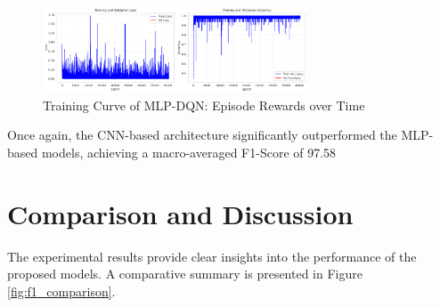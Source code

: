 \documentclass[16pt]{report}
\begin{document}
\begin{figure}[H]
    \centering
    \includegraphics[width=0.7\textwidth]{images/double_dqn_cnn_training_curves.png}
    \caption{Training Curve of MLP-DQN: Episode Rewards over Time}
    \label{fig:training_curve}
\end{figure}
\newpage
Once again, the CNN-based architecture significantly outperformed the MLP-based models, achieving a macro-averaged F1-Score of 97.58%

\section{Comparison and Discussion}
The experimental results provide clear insights into the performance of the proposed models. A comparative summary is presented in Figure \ref{fig:f1_comparison}.
\end{document}
